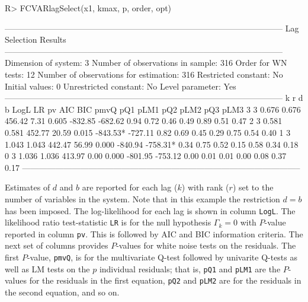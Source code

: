 \documentclass[article]{jss}
\begin{document}
\begin{CodeChunk} 
\begin{CodeInput}
R> FCVARlagSelect(x1, kmax, p, order, opt)
\end{CodeInput}
\begin{CodeOutput}
-----------------------------------------------------------------------------------------------------
                        Lag Selection Results 
-----------------------------------------------------------------------------------------------------
Dimension of system:       3     Number of observations in sample:          316 
Order for WN tests:       12     Number of observations for estimation:     316 
Restricted constant:      No     Initial values:                              0
Unrestricted constant:     No     Level parameter:                           Yes
-----------------------------------------------------------------------------------------------------
k  r    d    b      LogL     LR    pv    AIC       BIC     pmvQ pQ1  pLM1 pQ2  pLM2 pQ3  pLM3
 3  3 0.676 0.676  456.42   7.31 0.605  -832.85   -682.62  0.94 0.72 0.46 0.49 0.89 0.51 0.47
 2  3 0.581 0.581  452.77  20.59 0.015  -843.53*  -727.11  0.82 0.69 0.45 0.29 0.75 0.54 0.40
 1  3 1.043 1.043  442.47  56.99 0.000  -840.94   -758.31* 0.34 0.75 0.52 0.15 0.58 0.34 0.18
 0  3 1.036 1.036  413.97   0.00 0.000  -801.95   -753.12  0.00 0.01 0.01 0.00 0.08 0.37 0.17
-----------------------------------------------------------------------------------------------------
\end{CodeOutput}
\end{CodeChunk} 

Estimates of $d$ and $b$ are reported for each lag ($k$) with rank ($r$) set to the number of variables in the system. Note that in this example the restriction $d=b$ has been imposed. The log-likelihood for each lag is shown in column \verb|LogL|. The likelihood ratio test-statistic \verb|LR| is for the null hypothesis $\Gamma_k = 0$ with $P$-value reported in column \verb|pv|. This is followed by AIC and BIC information criteria. The next set of columns provides $P$-values for white noise tests on the residuals. The first $P$-value, \verb|pmvQ|, is for the multivariate Q-test followed by univarite Q-tests as well as LM tests on the $p$ individual residuals; that is, \verb|pQ1| and \verb|pLM1| are the $P$-values for the residuals in the first equation, \verb|pQ2| and \verb|pLM2| are for the residuals in the second equation, and so on. 
\end{document}
